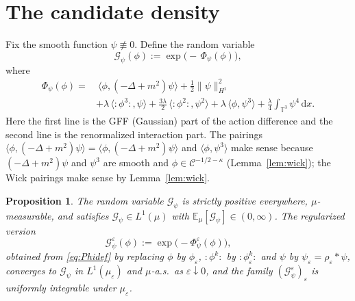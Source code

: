 \documentclass[12pt]{article}
\newtheorem{proposition}{Proposition}
\theoremstyle{definition}
\newcommand{\T}{\mathbb{T}^3}
\newcommand{\E}{\mathbb{E}}
\newcommand{\dd}{\mathrm{d}}
\newcommand{\Wick}[1]{{:}#1{:}}
\begin{document}
\section{The candidate density}\label{sec:density}

Fix the smooth function $\psi\not\equiv0$. Define the random variable
\begin{equation}\label{eq:G}
  \mathcal G_\psi(\phi)
  :=\exp\!\Big(-\,\Phi_\psi(\phi)\Big),
\end{equation}
where
\begin{equation}\label{eq:Phidef}
\begin{aligned}
  \Phi_\psi(\phi)
  =&\ \langle\phi,(-\Delta+m^2)\psi\rangle
     +\tfrac12\|\psi\|_{H^1}^2 \\
   &+\lambda\,\langle \Wick{\phi^3},\psi\rangle
     +\tfrac{3\lambda}{2}\,\langle \Wick{\phi^2},\psi^2\rangle
     +\lambda\,\langle\phi,\psi^3\rangle
     +\tfrac{\lambda}{4}\!\int_{\T}\psi^4\,\dd x .
\end{aligned}
\end{equation}
Here the first line is the GFF (Gaussian) part of the action difference and the second
line is the renormalized interaction part. The pairings
$\langle\phi,(-\Delta+m^2)\psi\rangle=\langle\phi,(-\Delta+m^2)\psi\rangle$ and
$\langle\phi,\psi^3\rangle$ make sense because $(-\Delta+m^2)\psi$ and $\psi^3$ are
smooth and $\phi\in\mathcal C^{-1/2-\kappa}$ (Lemma~\ref{lem:wick}); the Wick pairings
make sense by Lemma~\ref{lem:wick}.

\begin{proposition}\label{prop:density}
The random variable $\mathcal G_\psi$ is strictly positive everywhere, $\mu$-measurable,
and satisfies $\mathcal G_\psi\in L^1(\mu)$ with $\E_\mu[\mathcal G_\psi]\in(0,\infty)$.
The regularized version
\begin{equation}\label{eq:Geps}
  \mathcal G_\psi^\varepsilon(\phi):=\exp\!\big(-\Phi_\psi^\varepsilon(\phi)\big),\qquad
\end{equation}
obtained from \eqref{eq:Phidef} by replacing $\phi$ by $\phi_\varepsilon$,
$\Wick{\phi^k}$ by $\Wick{\phi_\varepsilon^k}$ and $\psi$ by $\psi_\varepsilon=\rho_\varepsilon*\psi$,
converges to $\mathcal G_\psi$ in $L^1(\mu_\varepsilon)$ and $\mu$-a.s.\ as
$\varepsilon\downarrow0$, and the family $(\mathcal G_\psi^\varepsilon)_\varepsilon$ is
uniformly integrable under $\mu_\varepsilon$.
\end{proposition}
\end{document}
